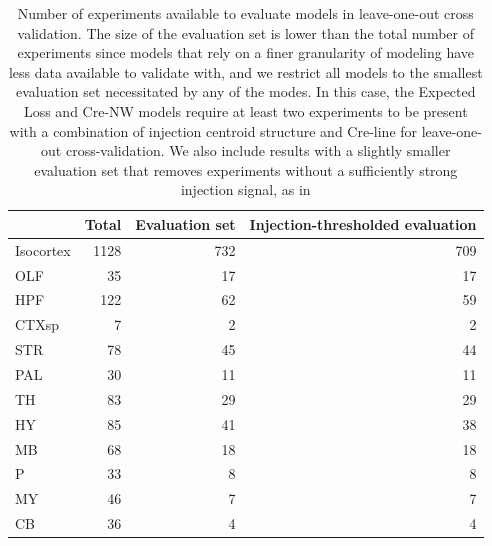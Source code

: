 \newpage

\begin{table}[H]
\small
\begin{tabular}{lrrr}
\toprule
{} &  Total &  Evaluation set &  Injection-thresholded evaluation \\
\midrule
Isocortex &   1128 &             732 &                               709 \\
OLF       &     35 &              17 &                                17 \\
HPF       &    122 &              62 &                                59 \\
CTXsp     &      7 &               2 &                                 2 \\
STR       &     78 &              45 &                                44 \\
PAL       &     30 &              11 &                                11 \\
TH        &     83 &              29 &                                29 \\
HY        &     85 &              41 &                                38 \\
MB        &     68 &              18 &                                18 \\
P         &     33 &               8 &                                 8 \\
MY        &     46 &               7 &                                 7 \\
CB        &     36 &               4 &                                 4 \\
\bottomrule
\end{tabular}
\caption{Number of experiments available to evaluate models in leave-one-out cross validation.
The size of the evaluation set is lower than the total number of experiments since models that rely on a finer granularity of modeling have less data available to validate with,
and we restrict all models to the smallest evaluation set necessitated by any of the modes.
In this case, the Expected Loss and Cre-NW models require at least two experiments to be present with a combination of injection centroid structure and Cre-line for leave-one-out cross-validation. 
We also include results with a slightly smaller evaluation set that removes experiments without a sufficiently strong injection signal, as in \citet{Knox2019-ot}} 
\label{tab:eval_size}
\end{table}

